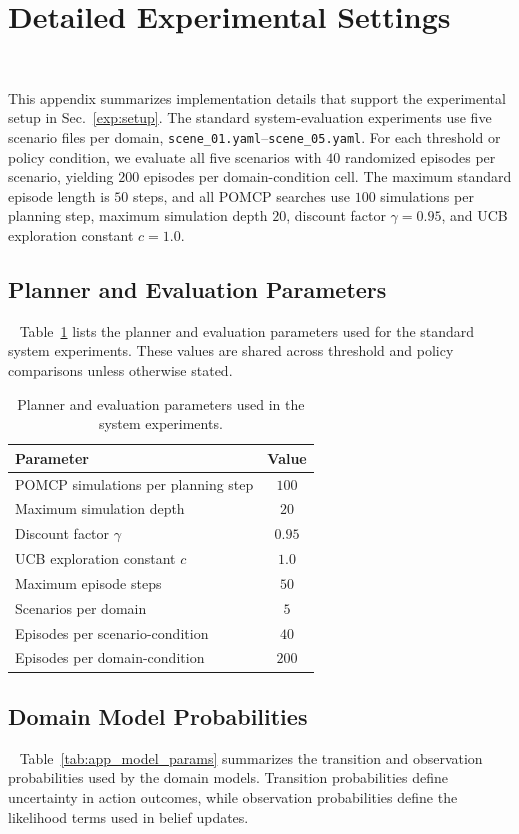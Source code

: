\section{Detailed Experimental Settings}~\label{appx:settings}

This appendix summarizes implementation details that support the experimental setup in Sec.~\ref{exp:setup}. The standard system-evaluation experiments use five scenario files per domain, \texttt{scene\_01.yaml}--\texttt{scene\_05.yaml}. For each threshold or policy condition, we evaluate all five scenarios with $40$ randomized episodes per scenario, yielding $200$ episodes per domain-condition cell. The maximum standard episode length is $50$ steps, and all POMCP searches use $100$ simulations per planning step, maximum simulation depth $20$, discount factor $\gamma=0.95$, and UCB exploration constant $c=1.0$.

\subsection{Planner and Evaluation Parameters}~\label{appx:planner_params}
Table~\ref{tab:app_planner_params} lists the planner and evaluation parameters used for the standard system experiments. These values are shared across threshold and policy comparisons unless otherwise stated.

\begin{table}[h]
\centering
\caption{Planner and evaluation parameters used in the system experiments.}
\label{tab:app_planner_params}
\small
\begin{tabular}{lc}
\toprule
\textbf{Parameter} & \textbf{Value} \\
\midrule
POMCP simulations per planning step & $100$ \\
Maximum simulation depth & $20$ \\
Discount factor $\gamma$ & $0.95$ \\
UCB exploration constant $c$ & $1.0$ \\
Maximum episode steps & $50$ \\
Scenarios per domain & $5$ \\
Episodes per scenario-condition & $40$ \\
Episodes per domain-condition & $200$ \\
\bottomrule
\end{tabular}
\end{table}

\subsection{Domain Model Probabilities}~\label{appx:model_params}
Table~\ref{tab:app_model_params} summarizes the transition and observation probabilities used by the domain models. Transition probabilities define uncertainty in action outcomes, while observation probabilities define the likelihood terms used in belief updates.

